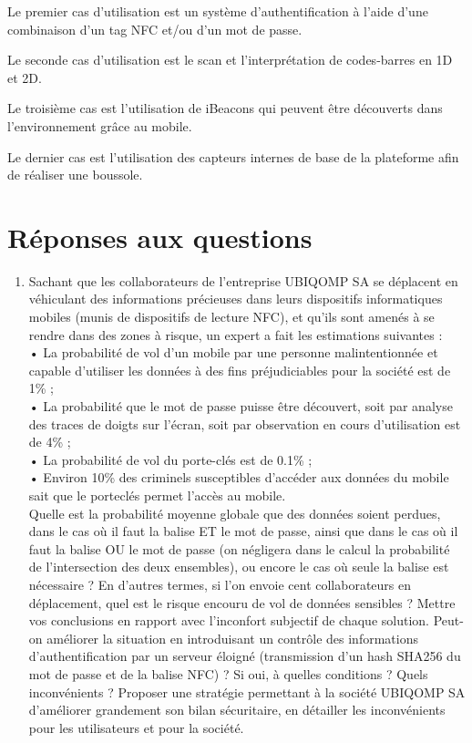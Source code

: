 \documentclass[a4paper]{article}
\begin{document}
Le premier cas d'utilisation est un système d'authentification à l'aide d'une combinaison d'un tag NFC et/ou d'un mot de passe.

Le seconde cas d'utilisation est le scan et l'interprétation de codes-barres en 1D et 2D.

Le troisième cas est l'utilisation de iBeacons qui peuvent être découverts dans l'environnement grâce au mobile.

Le dernier cas est l'utilisation des capteurs internes de base de la plateforme afin de réaliser une boussole.

\section{Réponses aux questions}

\begin{enumerate}
	\item Sachant que les collaborateurs de l'entreprise UBIQOMP SA se déplacent en véhiculant des
    informations précieuses dans leurs dispositifs informatiques mobiles (munis de dispositifs de lecture NFC), et qu'ils sont amenés à se rendre dans des zones à risque, un expert a fait les estimations suivantes : \\
    • La probabilité de vol d'un mobile par une personne malintentionnée et capable d'utiliser
    les données à des fins préjudiciables pour la société est de 1\% ; \\
    • La probabilité que le mot de passe puisse être découvert, soit par analyse des traces de
    doigts sur l'écran, soit par observation en cours d'utilisation est de 4\% ; \\
    • La probabilité de vol du porte-clés est de 0.1\% ; \\
    • Environ 10\% des criminels susceptibles d'accéder aux données du mobile sait que le porteclés
    permet l’accès au mobile. \\
    Quelle est la probabilité moyenne globale que des données soient perdues, dans le cas où il faut la
    balise ET le mot de passe, ainsi que dans le cas où il faut la balise OU le mot de passe (on négligera
    dans le calcul la probabilité de l’intersection des deux ensembles), ou encore le cas où seule la balise
    est nécessaire ? En d'autres termes, si l'on envoie cent collaborateurs en déplacement, quel est le
    risque encouru de vol de données sensibles ? Mettre vos conclusions en rapport avec l'inconfort
    subjectif de chaque solution.
    Peut-on améliorer la situation en introduisant un contrôle des informations d'authentification par un
    serveur éloigné (transmission d'un hash SHA256 du mot de passe et de la balise NFC) ? Si oui, à quelles
    conditions ? Quels inconvénients ?
    Proposer une stratégie permettant à la société UBIQOMP SA d'améliorer grandement son bilan
    sécuritaire, en détailler les inconvénients pour les utilisateurs et pour la société.
    

\end{enumerate}
\end{document}
